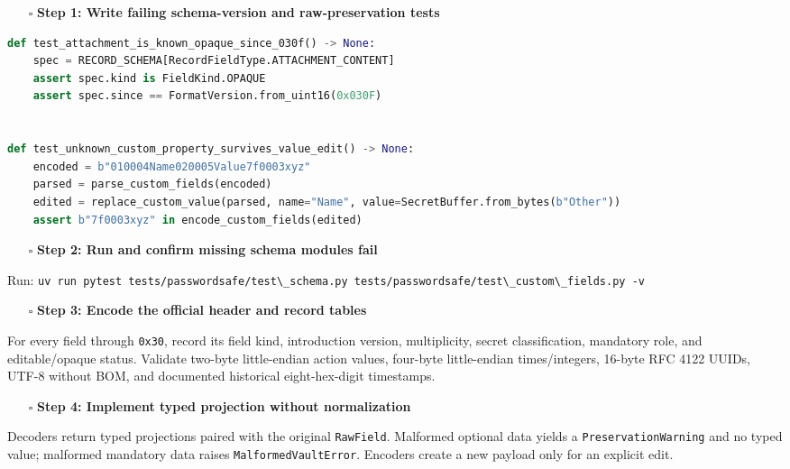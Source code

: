 \documentclass[
  letterpaper,
]{article}
\newcommand{\passthrough}[1]{#1}
\providecommand{\tightlist}{%
  \setlength{\itemsep}{0pt}\setlength{\parskip}{0pt}}
\begin{document}
\begin{itemize}
\tightlist
\item[$\square$]
  \textbf{Step 1: Write failing schema-version and raw-preservation tests}
\end{itemize}

\begin{lstlisting}[language=Python]
def test_attachment_is_known_opaque_since_030f() -> None:
    spec = RECORD_SCHEMA[RecordFieldType.ATTACHMENT_CONTENT]
    assert spec.kind is FieldKind.OPAQUE
    assert spec.since == FormatVersion.from_uint16(0x030F)


def test_unknown_custom_property_survives_value_edit() -> None:
    encoded = b"010004Name020005Value7f0003xyz"
    parsed = parse_custom_fields(encoded)
    edited = replace_custom_value(parsed, name="Name", value=SecretBuffer.from_bytes(b"Other"))
    assert b"7f0003xyz" in encode_custom_fields(edited)
\end{lstlisting}

\begin{itemize}
\tightlist
\item[$\square$]
  \textbf{Step 2: Run and confirm missing schema modules fail}
\end{itemize}

Run:
\passthrough{\lstinline!uv run pytest tests/passwordsafe/test\_schema.py tests/passwordsafe/test\_custom\_fields.py -v!}

\begin{itemize}
\tightlist
\item[$\square$]
  \textbf{Step 3: Encode the official header and record tables}
\end{itemize}

For every field through \passthrough{\lstinline!0x30!}, record its field kind, introduction version, multiplicity,
secret classification, mandatory role, and editable/opaque status. Validate two-byte little-endian action values,
four-byte little-endian times/integers, 16-byte RFC 4122 UUIDs, UTF-8 without BOM, and documented historical
eight-hex-digit timestamps.

\begin{itemize}
\tightlist
\item[$\square$]
  \textbf{Step 4: Implement typed projection without normalization}
\end{itemize}

Decoders return typed projections paired with the original \passthrough{\lstinline!RawField!}. Malformed optional data
yields a \nolinkurl{PreservationWarning} and no typed value; malformed mandatory data raises
\nolinkurl{MalformedVaultError}. Encoders create a new payload only for an explicit edit.
\end{document}
